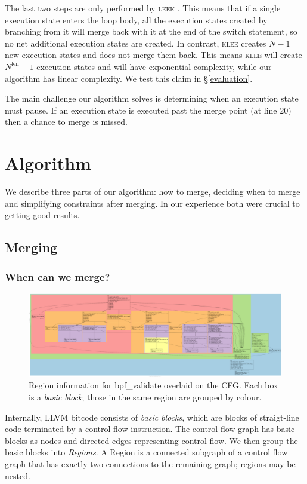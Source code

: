 \documentclass[12pt,a4paper]{article}
\newcommand{\klee}{\textsc{klee }}
\newcommand{\leek}{\textsc{leek }}
\begin{document}
The last two steps are only performed by \leek. This means that if a single execution state enters the loop body, all the execution states created by branching from it will merge back with it at the end of the switch statement, so no net additional execution states are created. In contrast, \klee creates $N-1$ new execution states and does not merge them back. This means \klee will create $N^\text{len} - 1$ execution states and will have exponential complexity, while our algorithm has linear complexity. We test this claim in \S\ref{evaluation}.

The main challenge our algorithm solves is determining when an execution state must pause. If an execution state is executed past the merge point (at line 20) then a chance to merge is missed.

\section{Algorithm}\label{algorithm}
We describe three parts of our algorithm: how to merge, deciding when to merge and simplifying constraints after merging. In our experience both were crucial to getting good results.

\subsection{Merging}
\subsubsection{When can we merge?}

\begin{figure}
  \centering
    \includegraphics[width=\textwidth]{reg.png}
  \caption{Region information for bpf\_validate overlaid on the CFG. Each box is a \emph{basic block}; those in the same region are grouped by colour.}
\end{figure}

Internally, LLVM bitcode consists of \emph{basic blocks}, which are blocks of straigt-line code terminated by a control flow instruction. The control flow graph has basic blocks as nodes and directed edges representing control flow. We then group the basic blocks into \emph{Regions}. A Region \cite{regions} is a connected subgraph of a control flow graph that has exactly two connections to the remaining graph; regions may be nested. 
\end{document}
